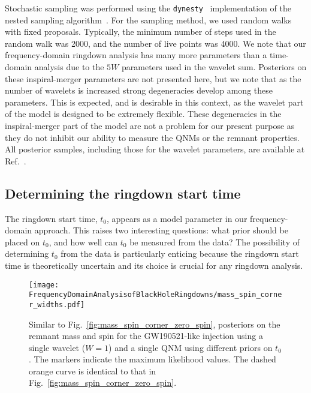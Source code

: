Stochastic sampling was performed using the \texttt{dynesty}~\cite{Speagle:2019ivv} implementation of the nested sampling algorithm~\cite{doi:10.1063/1.1835238, Skilling:2006gxv}.
For the sampling method, we used random walks with fixed proposals.
Typically, the minimum number of steps used in the random walk was 2000, and the number of live points was 4000.
We note that our frequency-domain ringdown analysis has many more parameters than a time-domain analysis due to the $5W$ parameters used in the wavelet sum.
Posteriors on these inspiral-merger parameters are not presented here, but we note that as the number of wavelets is increased strong degeneracies develop among these parameters.
This is expected, and is desirable in this context, as the wavelet part of the model is designed to be extremely flexible. 
These degeneracies in the inspiral-merger part of the model are not a problem for our present purpose as they do not inhibit our ability to measure the QNMs or the remnant properties. 
All posterior samples, including those for the wavelet parameters, are available at Ref.~\cite{finch_eliot_2021_5569759}.


\subsection{Determining the ringdown start time}\label{subsec:t0}

The ringdown start time, $t_0$, appears as a model parameter in our frequency-domain approach.
This raises two interesting questions: what prior should be placed on $t_0$, and how well can $t_0$ be measured from the data?
The possibility of determining $t_0$ from the data is particularly enticing because the ringdown start time is theoretically uncertain and its choice is crucial for any ringdown analysis.

\begin{figure}[b!]
    \centering
    \texttt{[image: FrequencyDomainAnalysisofBlackHoleRingdowns/mass\_spin\_corner\_widths.pdf]}
    \caption[Similar to Fig.~\ref{fig:mass_spin_corner_zero_spin}, posteriors on the remnant mass and spin for the GW190521-like injection using a single wavelet ($W=1$) and a single QNM using different priors on $t_0$]{ 
    Similar to Fig.~\ref{fig:mass_spin_corner_zero_spin}, posteriors on the remnant mass and spin for the GW190521-like injection using a single wavelet ($W=1$) and a single QNM using different priors on $t_0$.
    The markers indicate the maximum likelihood values.
    The dashed orange curve is identical to that in Fig.~\ref{fig:mass_spin_corner_zero_spin}.
    }
    \label{fig:start_time_prior}
\end{figure}


